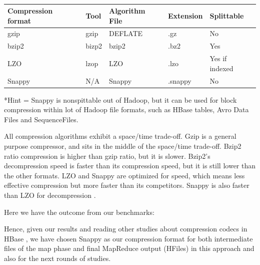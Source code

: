 \begin{table}[htbp]
\caption{}
\begin{tabular}{|l|l|l|l|l|}
\hline
Compression format  & Tool  & Algorithm File  & Extension  & Splittable \\ \hline
gzip &  gzip  & DEFLATE  & .gz &  No \\ \hline
bzip2  & bizp2  & bzip2  & .bz2  & Yes \\ \hline
LZO &  lzop &  LZO  & .lzo &  Yes if indexed \\ \hline
Snappy  & N/A  & Snappy  & .snappy  & No \\ \hline
\end{tabular}
\label{}
\end{table}


*Hint = Snappy is nonspittable out of Hadoop, but it can be used for block compression within lot of Hadoop file formats, such as HBase tables, Avro Data Files and SequenceFiles.
\par
All compression algorithms exhibit a space/time trade-off. Gzip is a general purpose compressor, and sits in the middle of the space/time trade-off. Bzip2 ratio compression is higher than gzip ratio, but it is slower. Bzip2's decompression speed is faster than its compression speed, but it is still lower than the other formats. LZO and Snappy are optimized for speed, which means less effective compression but more faster than its competitors. Snappy is also faster than LZO for decompression \cite{CompressionHadoop}.
\par
Here we have the outcome from our benchmarks:
\par



Hence, given our results and reading other studies about compression codecs in HBase \cite{CompressionComparison}, we have chosen Snappy as our compression format for both intermediate files of the map phase and final MapReduce output (HFiles) in this approach and also for the next rounds of studies.




